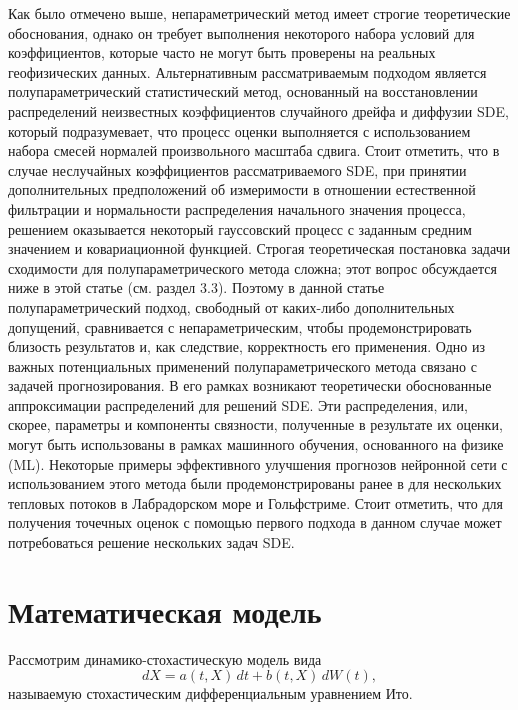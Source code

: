 Как было отмечено выше, непараметрический метод имеет строгие теоретические обоснования, однако он требует выполнения некоторого набора условий для коэффициентов, которые часто не могут быть проверены на реальных геофизических данных. Альтернативным рассматриваемым подходом является полупараметрический статистический метод, основанный на восстановлении распределений неизвестных коэффициентов случайного дрейфа и диффузии SDE, который подразумевает, что процесс оценки выполняется с использованием набора смесей нормалей произвольного масштаба сдвига. Стоит отметить, что в случае неслучайных коэффициентов рассматриваемого SDE, при принятии дополнительных предположений об измеримости в отношении естественной фильтрации и нормальности распределения начального значения процесса, решением оказывается некоторый гауссовский процесс с заданным средним значением и ковариационной функцией. Строгая теоретическая постановка задачи сходимости для полупараметрического метода сложна; этот вопрос обсуждается ниже в этой статье (см. раздел 3.3). Поэтому в данной статье полупараметрический подход, свободный от каких-либо дополнительных допущений, сравнивается с непараметрическим, чтобы продемонстрировать близость результатов и, как следствие, корректность его применения. Одно из важных потенциальных применений полупараметрического метода связано с задачей прогнозирования. В его рамках возникают теоретически обоснованные аппроксимации распределений для решений SDE. Эти распределения, или, скорее, параметры и компоненты связности, полученные в результате их оценки, могут быть использованы в рамках машинного обучения, основанного на физике (ML). Некоторые примеры эффективного улучшения прогнозов нейронной сети с использованием этого метода были продемонстрированы ранее в \cite{Kuzmin2022} для нескольких тепловых потоков в Лабрадорском море и Гольфстриме. Стоит отметить, что для получения точечных оценок с помощью первого подхода в данном случае может потребоваться решение нескольких задач SDE.

\section{Математическая модель}
\label{sec:Model}

Рассмотрим динамико-стохастическую модель вида
\begin{equation}
	\label{eq:Ito}
	dX = a(t,X)\,dt + b(t, X)\,dW(t), 
\end{equation}
называемую стохастическим дифференциальным уравнением Ито.


